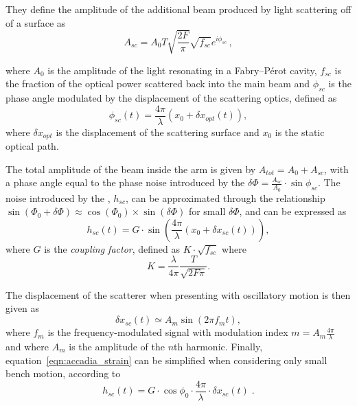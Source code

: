 They define the amplitude of the additional beam produced by light scattering off of a surface as
%
\begin{equation}
    A_{sc} = A_{0} T \sqrt{\frac{2 F}{\pi}} \sqrt{f_{sc}} e^{i \phi_{sc}}\,,
    \label{eqn:accadia_amplitude}
\end{equation}

%
where $A_{0}$ is the amplitude of the light resonating in a Fabry–Pérot cavity, $f_{sc}$ is the fraction of the optical power scattered back into the main beam and $\phi_{sc}$ is the phase angle modulated by the displacement of the scattering optics, defined as
%
\begin{equation}
    \phi_{sc}(t) = \frac{4 \pi}{\lambda} ( x_{0} + \delta x_{opt}(t) ),
    \label{eqn:accadia_phase_noise}
\end{equation}
%
where $\delta x_{opt}$ is the displacement of the scattering surface and $x_0$ is the static optical path.

The total amplitude of the beam inside the arm is given by $A_{tot} = A_{0} + A_{sc}$, with a phase angle equal to the phase noise introduced by the \scl{} $\delta \Phi = \frac{A_{sc}}{A_{0}} \cdot \sin \phi_{sc}$. The noise introduced by the \scl{}, $h_{sc}$, can be approximated through the relationship $\sin(\Phi_0+ \delta\Phi) \approx \cos(\Phi_0) \times \sin(\delta \Phi)$ for small $\delta\Phi$, and can be expressed as
%
\begin{equation}
    h_{sc}(t) = G \cdot \sin \left(\frac{4 \pi}{\lambda} (x_{0} + \delta x_{sc}(t) ) \right),
    \label{eqn:accadia_strain}
\end{equation}
%
where $G$ is the \emph{coupling factor}, defined as $K \cdot \sqrt{f_{sc}}$ where
%
\begin{equation}
K = \frac{\lambda}{4 \pi} \frac{T}{\sqrt{2 F \pi}}.
\end{equation}
%

The displacement of the scatterer when presenting with oscillatory motion is then given as
%
\begin{equation}
    \delta x_{sc} (t) \simeq A_{m} \sin(2 \pi f_{m} t),
    \label{eqn:accadia_oscillatory}
\end{equation}
%
where $f_{m}$ is the frequency-modulated signal with modulation index $m = A_{m} \frac{4 \pi}{\lambda}$ and where $A_{m}$ is the amplitude of the $n$th harmonic. Finally, equation~\ref{eqn:accadia_strain} can be simplified when considering only small bench motion, according to
%
\begin{equation}
    h_{sc}(t) = G \cdot \cos\phi_{0} \cdot \frac{4 \pi}{\lambda} \cdot \delta x_{sc}(t) \;.
    \label{eqn:accadia_strain_linearized}
\end{equation}

